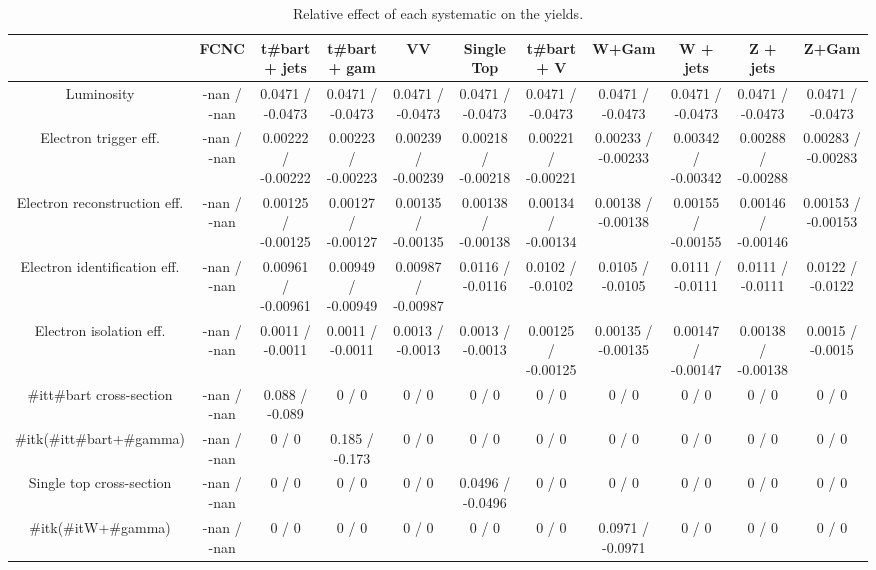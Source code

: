 \begin{table}[htbp]
\begin{center}
\footnotesize
\begin{tabular}{|c|c|c|c|c|c|c|c|c|c|c|}
\hline 
      & FCNC      & t#bar{t} + jets      & t#bar{t} +  gam      & VV      & Single Top      & t#bar{t} + V      & W+Gam      & W + jets      & Z + jets      & Z+Gam \\ 
\hline 
  Luminosity & -nan / -nan & 0.0471 / -0.0473 & 0.0471 / -0.0473 & 0.0471 / -0.0473 & 0.0471 / -0.0473 & 0.0471 / -0.0473 & 0.0471 / -0.0473 & 0.0471 / -0.0473 & 0.0471 / -0.0473 & 0.0471 / -0.0473 \\ 
  Electron trigger eff. & -nan / -nan & 0.00222 / -0.00222 & 0.00223 / -0.00223 & 0.00239 / -0.00239 & 0.00218 / -0.00218 & 0.00221 / -0.00221 & 0.00233 / -0.00233 & 0.00342 / -0.00342 & 0.00288 / -0.00288 & 0.00283 / -0.00283 \\ 
  Electron reconstruction eff. & -nan / -nan & 0.00125 / -0.00125 & 0.00127 / -0.00127 & 0.00135 / -0.00135 & 0.00138 / -0.00138 & 0.00134 / -0.00134 & 0.00138 / -0.00138 & 0.00155 / -0.00155 & 0.00146 / -0.00146 & 0.00153 / -0.00153 \\ 
  Electron identification eff. & -nan / -nan & 0.00961 / -0.00961 & 0.00949 / -0.00949 & 0.00987 / -0.00987 & 0.0116 / -0.0116 & 0.0102 / -0.0102 & 0.0105 / -0.0105 & 0.0111 / -0.0111 & 0.0111 / -0.0111 & 0.0122 / -0.0122 \\ 
  Electron isolation eff. & -nan / -nan & 0.0011 / -0.0011 & 0.0011 / -0.0011 & 0.0013 / -0.0013 & 0.0013 / -0.0013 & 0.00125 / -0.00125 & 0.00135 / -0.00135 & 0.00147 / -0.00147 & 0.00138 / -0.00138 & 0.0015 / -0.0015 \\ 
  #it{t#bar{t}} cross-section & -nan / -nan & 0.088 / -0.089 & 0 / 0 & 0 / 0 & 0 / 0 & 0 / 0 & 0 / 0 & 0 / 0 & 0 / 0 & 0 / 0 \\ 
  #it{k}(#it{t#bar{t}+#gamma}) & -nan / -nan & 0 / 0 & 0.185 / -0.173 & 0 / 0 & 0 / 0 & 0 / 0 & 0 / 0 & 0 / 0 & 0 / 0 & 0 / 0 \\ 
  Single top cross-section & -nan / -nan & 0 / 0 & 0 / 0 & 0 / 0 & 0.0496 / -0.0496 & 0 / 0 & 0 / 0 & 0 / 0 & 0 / 0 & 0 / 0 \\ 
  #it{k}(#it{W+#gamma}) & -nan / -nan & 0 / 0 & 0 / 0 & 0 / 0 & 0 / 0 & 0 / 0 & 0.0971 / -0.0971 & 0 / 0 & 0 / 0 & 0 / 0 \\ 
\hline 
\end{tabular} 
\caption{Relative effect of each systematic on the yields.} 
\end{center} 
\end{table} 
